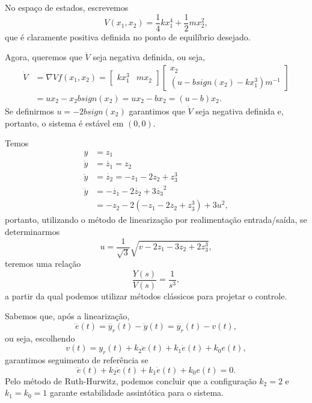 \documentclass[a4paper]{report}
\begin{document}

No espaço de estados, escrevemos \[
    V(x_1, x_2) = \frac{1}{4}k x_1^{4} + \frac{1}{2}mx_2^2
,\] que é claramente positiva definida no ponto de equilíbrio desejado.

Agora, queremos que $\dot{V}$ seja negativa definida, ou seja, 
\begin{align*}
    \dot{V} &= \nabla V f(x_1,x_2) = \begin{bmatrix} kx_1^3 & mx_2 \end{bmatrix} \begin{bmatrix} x_2 \\  \left(  u - b sign(x_2) - kx_1^3   \right) m^{-1} \end{bmatrix} \\
    &= ux_2 -x_2bsign(x_2) = u x_2 - b x_2 = \left( u - b \right) x_2
.\end{align*}
Se definirmos $u = -2b sign(x_2)$ garantimos que $\dot{V}$ seja negativa definida e, portanto, o sistema é estável em $(0,0)$.



Temos
\begin{align*}
    y &= z_1 \\
    \dot{y} &= \dot{z_1} = z_2 \\
    \ddot{y} &= \dot{z_2} = -z_1 -2z_2 + z_3^3 \\
    \dddot{y} &= -\dot{z_1} -2\dot{z_2} + 3\dot{z_3}^2 \\
	      &= -z_2 -2\left( -z_1 -2z_2 + z_3^3  \right) +3u^2
,\end{align*}
portanto, utilizando o método de linearização por realimentação entrada/saída, se determinarmos \[
u = \frac{1}{\sqrt{3} } \sqrt{v -2z_1 -3z_2 + 2z_3^3} 
,\] teremos uma relação \[
\frac{Y(s)}{V(s)} = \frac{1}{s^3}
,\] a partir da qual podemos utilizar métodos clássicos para projetar o controle.


Sabemos que, após a linearização, \[
\dddot{e}(t) = \dddot{y_r}(t) - \dddot{y}(t) = \dddot{y_r}(t) - v(t)
,\] ou seja, escolhendo \[
v(t) = y_r(t) + k_2\ddot{e}(t) + k_1\dot{e}(t) + k_0e(t)
,\] garantimos seguimento de referência se \[
\dddot{e}(t) + k_2\ddot{e}(t) + k_1\dot{e}(t) + k_0e(t) = 0
.\] Pelo método de Ruth-Hurwitz, podemos concluir que a configuração $k_2=2$ e $k_1=k_0=1$ garante estabilidade assintótica para o sistema.

\end{document}
